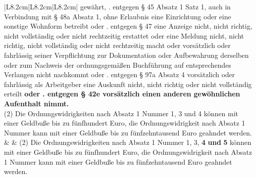 \documentclass[10pt,a4paper,landscape]{article}
\begin{document}
\begin{longtable}{|L{8.2cm}|L{8.2cm}|L{8.2cm}|}
gewährt,   . entgegen \S{} 45 Absatz 1 Satz 1, auch in  \newline Verbindung mit \S{} 48a Absatz 1, ohne  \newline Erlaubnis eine Einrichtung oder eine  \newline sonstige Wohnform betreibt oder   . entgegen \S{} 47 eine Anzeige nicht, nicht  \newline richtig, nicht vollständig oder nicht  \newline rechtzeitig erstattet oder eine Meldung nicht,  \newline nicht richtig, nicht vollständig oder nicht  \newline rechtzeitig macht oder vorsätzlich oder  \newline fahrlässig seiner Verpflichtung zur  \newline Dokumentation oder Aufbewahrung  derselben oder zum Nachweis der  \newline ordnungsgemäßen Buchführung auf  \newline entsprechendes Verlangen nicht  \newline nachkommt oder   . entgegen \S{} 97a Absatz 4 vorsätzlich oder  \newline fahrlässig als Arbeitgeber eine Auskunft  \newline nicht, nicht richtig oder nicht vollständig  \newline \textcolor{diffgreen}{erteilt }\textbf{\textcolor{diffgreen}{oder  . entgegen \S{} 42e vorsätzlich einen  \newline anderen gewöhnlichen Aufenthalt  \newline nimmt.}} \\
\hhline{|---|}
(2) Die Ordnungswidrigkeiten nach Absatz 1  \newline Nummer 1, \textcolor{diffred}{3} und \textcolor{diffred}{4} können mit einer  \newline Geldbuße bis zu fünfhundert Euro, die  \newline Ordnungswidrigkeit nach Absatz 1 Nummer   kann mit einer Geldbuße bis zu  \newline fünfzehntausend Euro geahndet werden. &  & (2) Die Ordnungswidrigkeiten nach Absatz 1  \newline Nummer 1, \textcolor{diffgreen}{3, }\textbf{\textcolor{diffgreen}{4}}\textbf{ und }\textbf{\textcolor{diffgreen}{5}} können mit einer  \newline Geldbuße bis zu fünfhundert Euro, die  \newline Ordnungswidrigkeit nach Absatz 1 Nummer   kann mit einer Geldbuße bis zu  \newline fünfzehntausend Euro geahndet werden. \\

\end{longtable}
\end{document}
